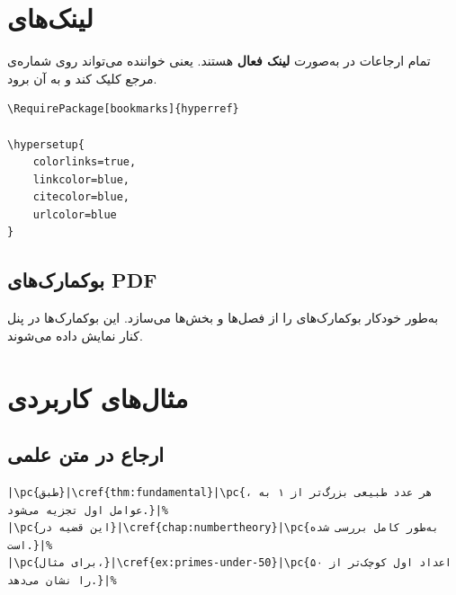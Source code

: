 
\section{لینک‌های }
\label{sec:cross-refs-hyperref}

تمام ارجاعات در  به‌صورت
\textbf{لینک فعال} هستند. یعنی خواننده
می‌تواند روی شماره‌ی مرجع کلیک کند و به آن
برود.

\begin{latin}
\begin{verbatim}
\RequirePackage[bookmarks]{hyperref}

\hypersetup{
    colorlinks=true,
    linkcolor=blue,
    citecolor=blue,
    urlcolor=blue
}
\end{verbatim}
\end{latin}


\subsection{بوکمارک‌های PDF}
\label{sec:cross-refs-bookmarks}

 به‌طور خودکار بوکمارک‌های
 را از فصل‌ها و بخش‌ها می‌سازد. این
بوکمارک‌ها در پنل کنار  نمایش داده
می‌شوند.


\section{مثال‌های کاربردی}
\label{sec:cross-refs-examples}

\subsection{ارجاع در متن علمی}
\label{sec:cross-refs-example-scientific}

\begin{latin}
\begin{verbatim}
|\pc{طبق}|\cref{thm:fundamental}|\pc{، هر عدد طبیعی بزرگ‌تر از ۱ به عوامل اول تجزیه می‌شود.}|%
|\pc{این قضیه در}|\cref{chap:numbertheory}|\pc{به‌طور کامل بررسی شده است.}|%
|\pc{برای مثال،}|\cref{ex:primes-under-50}|\pc{اعداد اول کوچک‌تر از ۵۰ را نشان می‌دهد.}|%
\end{verbatim}
\end{latin}

